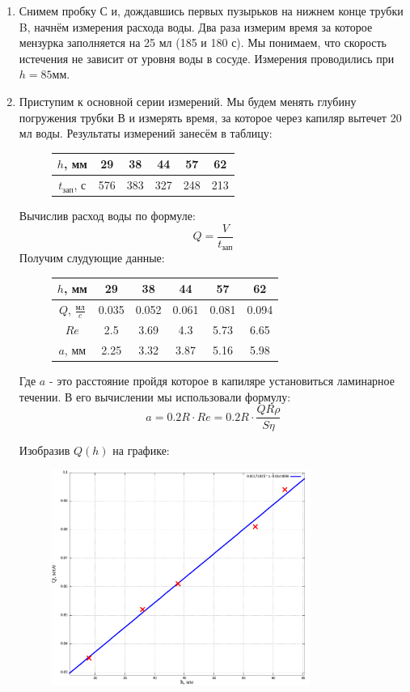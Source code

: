 \documentclass{article}
\begin{document}
\begin{enumerate}
    \item 
Снимем пробку С и, дождавшись первых пузырьков на нижнем конце трубки B, начнём измерения 
расхода воды.
Два раза измерим время за которое мензурка заполняется на 25 мл (185 и 180 с). Мы 
понимаем, что скорость истечения не зависит от уровня воды в сосуде. Измерения проводились при 
$h = 85 \text{мм}$.

    \item
Приступим к основной серии измерений. Мы будем менять глубину погружения трубки В и измерять 
время, за которое через капиляр вытечет 20 мл воды. Результаты измерений занесём в таблицу:

\begin{figure}[H]
    \centering
    \begin{tabular}{|c|c|c|c|c|c|}
        \hline
        $h$, мм&29&38&44&57&62\\\hline
        $t_{\text{зап}}$, с&576&383&327&248&213\\\hline
    \end{tabular}
\end{figure}

Вычислив расход воды по формуле:
\[ Q = \frac{V}{t_{\text{зап}}} \]
Получим слудующие данные:

\begin{figure}[H]
    \centering
    \begin{tabular}{|c|c|c|c|c|c|}
        \hline
        $h$, мм&29&38&44&57&62\\\hline
        $Q$, $\frac{\text{мл}}{c}$&0.035&0.052&0.061&0.081&0.094\\\hline
        $Re$&2.5&3.69&4.3&5.73&6.65\\\hline
        $a$, мм&2.25&3.32&3.87&5.16&5.98\\\hline
    \end{tabular}
\end{figure}
Где $a$ - это расстояние пройдя которое в капиляре установиться ламинарное течении.
В его вычислении мы использовали формулу:
\[ a = 0.2R\cdot Re = 0.2R\cdot\frac{QR\rho}{S\eta}\]

Изобразив $Q(h)$ на графике:

\begin{figure}[H]
    \centering
    \includegraphics[width=0.8\textwidth]{A.png}
\end{figure}


\end{enumerate}
\end{document}
